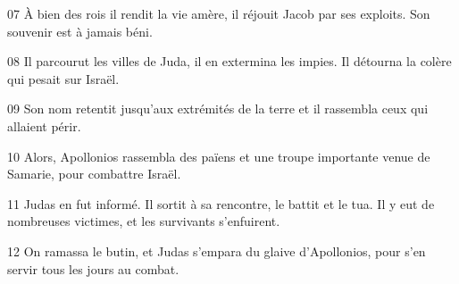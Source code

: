 07 À bien des rois il rendit la vie amère, il réjouit Jacob par ses exploits. Son souvenir est à jamais béni.

08 Il parcourut les villes de Juda, il en extermina les impies. Il détourna la colère qui pesait sur Israël.

09 Son nom retentit jusqu’aux extrémités de la terre et il rassembla ceux qui allaient périr.

10 Alors, Apollonios rassembla des païens et une troupe importante venue de Samarie, pour combattre Israël.

11 Judas en fut informé. Il sortit à sa rencontre, le battit et le tua. Il y eut de nombreuses victimes, et les survivants s’enfuirent.

12 On ramassa le butin, et Judas s’empara du glaive d’Apollonios, pour s’en servir tous les jours au combat.